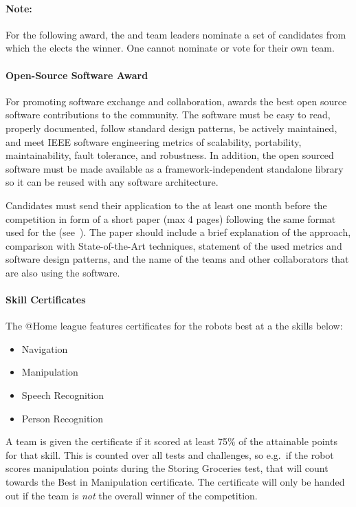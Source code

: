\paragraph*{Note: } For the following award, the \TC{} and team leaders nominate a set of candidates from which the \EC{} elects the winner. One cannot nominate or vote for their own team.

\paragraph{Open-Source Software Award}
\label{sec:introduction:assaward}
For promoting software exchange and collaboration, \RoboCup\AtHome{} awards the best open source software contributions to the community. The software must be easy to read, properly documented, follow standard design patterns, be actively maintained, and meet IEEE software engineering metrics of scalability, portability, maintainability, fault tolerance, and robustness. In addition, the open sourced software must be made available as a framework-independent standalone library so it can be reused with any software architecture.

Candidates must send their application to the \TC{} at least one month before the competition in form of a short paper (max 4 pages) following the same format used for the \TDP{} (see~). The paper should include a brief explanation of the approach, comparison with State-of-the-Art techniques, statement of the used metrics and software design patterns, and the name of the teams and other collaborators that are also using the software.

\paragraph{Skill Certificates}
\label{award:skill}
The @Home league features certificates for the robots best at a the skills below:
\begin{itemize}
	\item Navigation
	\item Manipulation
	\item Speech Recognition
	\item Person Recognition
\end{itemize}

A team is given the certificate if it scored at least 75\% of the attainable points for that skill.
This is counted over all tests and challenges, so e.g.~if the robot scores manipulation points during the Storing Groceries test, that will count towards the Best in Manipulation certificate.
The certificate will only be handed out if the team is \emph{not} the overall winner of the competition.